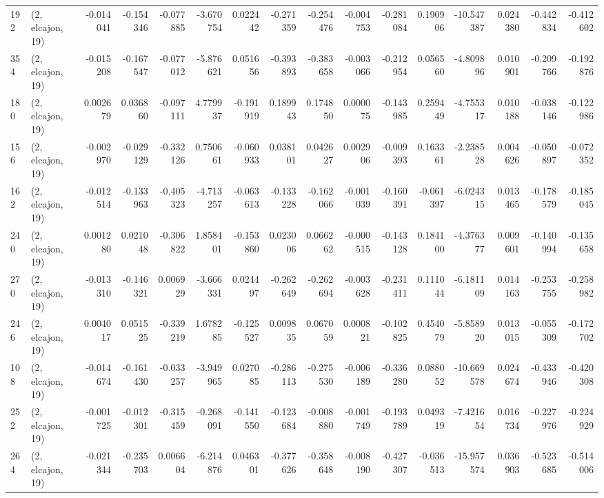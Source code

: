 \begin{tabular}{llrrrrrrrrrrrrrr}
192 &  (2, elcajon, 19) &  -0.014041 & -0.154346 & -0.077885 &   -3.670754 &  0.022442 &  -0.271359 & -0.254476 & -0.004753 & -0.281084 &  0.190906 &   -10.547387 &  0.024380 & -0.442834 & -0.412602 \\
354 &  (2, elcajon, 19) &  -0.015208 & -0.167547 & -0.077012 &   -5.876621 &  0.051656 &  -0.393893 & -0.383658 & -0.003066 & -0.212954 &  0.056560 &    -4.809896 &  0.010901 & -0.209766 & -0.192876 \\
180 &  (2, elcajon, 19) &   0.002679 &  0.036860 & -0.097111 &    4.779937 & -0.191919 &   0.189943 &  0.174850 &  0.000075 & -0.143985 &  0.259449 &    -4.755317 &  0.010188 & -0.038146 & -0.122986 \\
156 &  (2, elcajon, 19) &  -0.002970 & -0.029129 & -0.332126 &    0.750661 & -0.060933 &   0.038101 &  0.042627 &  0.002906 & -0.009393 &  0.163361 &    -2.238528 &  0.004626 & -0.050897 & -0.072352 \\
162 &  (2, elcajon, 19) &  -0.012514 & -0.133963 & -0.405323 &   -4.713257 & -0.063613 &  -0.133228 & -0.162066 & -0.001039 & -0.160391 & -0.061397 &    -6.024315 &  0.013465 & -0.178579 & -0.185045 \\
240 &  (2, elcajon, 19) &   0.001280 &  0.021048 & -0.306822 &    1.858401 & -0.153860 &   0.023006 &  0.066262 & -0.000515 & -0.143128 &  0.184100 &    -4.376377 &  0.009601 & -0.140994 & -0.135658 \\
270 &  (2, elcajon, 19) &  -0.013310 & -0.146321 &  0.006929 &   -3.666331 &  0.024497 &  -0.262649 & -0.262694 & -0.003628 & -0.231411 &  0.111044 &    -6.181109 &  0.014163 & -0.253755 & -0.258982 \\
246 &  (2, elcajon, 19) &   0.004017 &  0.051525 & -0.339219 &    1.678285 & -0.125527 &   0.009835 &  0.067059 &  0.000821 & -0.102825 &  0.454079 &    -5.858920 &  0.013015 & -0.055309 & -0.172702 \\
108 &  (2, elcajon, 19) &  -0.014674 & -0.161430 & -0.033257 &   -3.949965 &  0.027085 &  -0.286113 & -0.275530 & -0.006189 & -0.336280 &  0.088052 &   -10.669578 &  0.024674 & -0.433946 & -0.420308 \\
252 &  (2, elcajon, 19) &  -0.001725 & -0.012301 & -0.315459 &   -0.268091 & -0.141550 &  -0.123684 & -0.008880 & -0.001749 & -0.193789 &  0.049319 &    -7.421654 &  0.016734 & -0.227976 & -0.224929 \\
264 &  (2, elcajon, 19) &  -0.021344 & -0.235703 &  0.006604 &   -6.214876 &  0.046301 &  -0.377626 & -0.358648 & -0.008190 & -0.427307 & -0.036513 &   -15.957574 &  0.036903 & -0.523685 & -0.514006 \\

\end{tabular}
